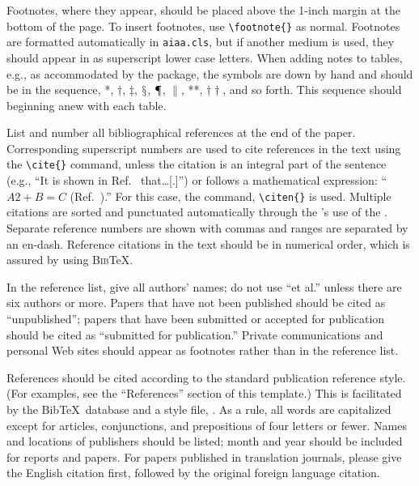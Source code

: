 Footnotes, where they appear, should be placed above the 1-inch margin at
the bottom of the page.
To insert footnotes, use \verb|\footnote{}| as normal.
Footnotes are formatted automatically in \verb|aiaa.cls|, but if
another medium is used, they should appear in as superscript lower case
letters.
When adding notes to tables, e.g., as accommodated by the
 package, the symbols are down by hand and should be
in the sequence, *, $\dagger$, $\ddagger$, $\mathsection$,
$\mathparagraph$, $\|$, **, $\dagger\dagger$, and so forth.
This sequence should beginning anew with each table.

List and number all bibliographical references at the end of the paper.
Corresponding superscript numbers are used to cite references in the
text using the \verb|\cite{}| command,\cite{sutton:85ar} unless the
citation is an integral part of the sentence (e.g., ``It is shown in
Ref.~ that\ldots[.]'') 
or follows a mathematical expression: ``$A2 + B = C$
(Ref.~).''
For this case, the command, \verb|\citen{}| is used.
\cite{*}%
Multiple citations are sorted and punctuated automatically through the
's use of the . 
Separate reference numbers are shown with
commas\cite{sutton:85ar,miner:75ncr,turner:64a} and ranges are 
separated by an en-dash.\cite{sutton:85ar,miner:75ncr,wirin:90cp}
Reference citations in the text should be in numerical order, which is
assured by using \textsc{Bib}\TeX.

In the reference list, give all authors' names; do not use ``et al.''
unless there are six authors or more.
Papers that have not been published should be cited as ``unpublished'';
papers that have been submitted or accepted for publication should be
cited as ``submitted for publication.''
Private communications and personal Web sites should appear as footnotes
rather than in the reference list.

References should be cited according to the standard publication
reference style.
(For examples, see the ``References'' section of this template.)
This is facilitated by the Bib\TeX\ database and a style file, .
As a rule, all words are capitalized except for articles, conjunctions,
and prepositions of four letters or fewer.
Names and locations of publishers should be listed; month and year
should be included for reports and papers.
For papers published in translation journals, please give the English
citation first, followed by the original foreign language citation.


